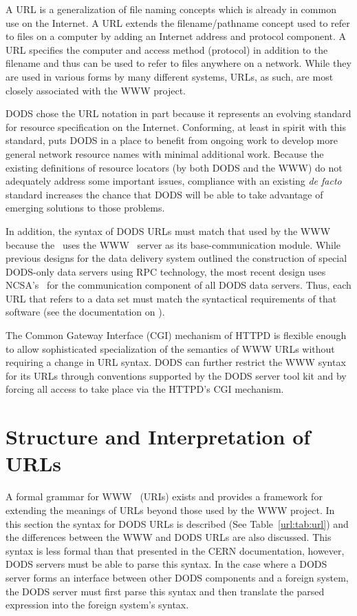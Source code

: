A URL is a generalization of file naming concepts which is already in common
use on the Internet. A URL extends the filename/pathname concept used to
refer to files on a computer by adding an Internet address and protocol
component. A URL specifies the computer and access method (protocol) in
addition to the filename and thus can be used to refer to files anywhere on a
network. While they are used in various forms by many different systems,
URLs, as such, are most closely associated with the WWW project.

DODS chose the URL notation in part because it represents an evolving
standard for resource specification on the Internet. Conforming, at least in
spirit with this standard, puts DODS in a place to benefit from ongoing work
to develop more general network resource names with minimal additional work.
Because the existing definitions of resource locators (by both DODS and the
WWW) do not adequately address some important issues, compliance with an
existing {\em de facto\/} standard increases the chance that DODS will be
able to take advantage of emerging solutions to those problems.

In addition, the syntax of DODS URLs must match that used by the WWW because
the \ddd\ uses the WWW \HTTPD\ server as its base-communication module. While
previous designs for the data delivery system outlined the construction of
special DODS-only data servers using RPC technology, the most recent design
uses NCSA's \HTTPD\ for the communication component of all DODS data
servers. Thus, each URL that refers to a data set must match the syntactical
requirements of that software (see the documentation on \HTTP). 

The Common Gateway Interface (CGI) mechanism of HTTPD is flexible enough to
allow sophisticated specialization of the semantics of WWW URLs without
requiring a change in URL syntax. DODS can further restrict the WWW syntax
for its URLs through conventions supported by the DODS server tool kit and by
forcing all access to take place via the HTTPD's CGI mechanism.

\section{Structure and Interpretation of URLs}
\label{url:structure}

A formal grammar for WWW \uri\ (URIs) exists and provides a framework for
extending the meanings of URLs beyond those used by the WWW project. In this
section the syntax for DODS URLs is described (See Table~\ref{url:tab:url}) and
the differences between the WWW and DODS URLs are also discussed. This syntax
is less formal than that presented in the CERN documentation, however, DODS
servers must be able to parse this syntax. In the case where a DODS server
forms an interface between other DODS components and a foreign system, the
DODS server must first parse this syntax and then translate the parsed
expression into the foreign system's syntax.

